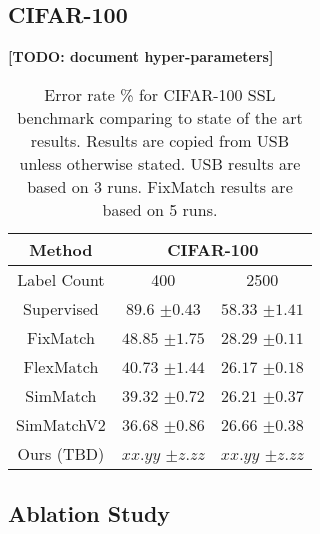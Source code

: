 \documentclass[10pt,twocolumn,letterpaper]{article}
\newcommand{\TODO}[1]{\textbf{\color{red}[TODO: #1]}}
\begin{document}

\subsection{CIFAR-100}

\TODO {document hyper-parameters}


\begin{table}[htbp]
	\begin{tabular}{c|cc}
		Method            & \multicolumn{2}{c}{CIFAR-100} \\ 
		\hline
		Label Count           & 400           & 2500          \\
		Supervised   & $89.6$ \scriptsize{$\pm0.43$}    & $58.33$ \scriptsize{$\pm1.41$}   \\ \hline
		FixMatch      & $48.85$ \scriptsize{$\pm1.75$}   & $28.29$ \scriptsize{$\pm0.11$}   \\
		FlexMatch   & $40.73$ \scriptsize{$\pm1.44$}   & $26.17$ \scriptsize{$\pm0.18$}   \\
		SimMatch    & $39.32$ \scriptsize{$\pm0.72$}   & $26.21$ \scriptsize{$\pm0.37$}   \\
		SimMatchV2    & $36.68$ \scriptsize{$\pm0.86$}   & $26.66$ \scriptsize{$\pm0.38$}   \\ \hline
		Ours (TBD)                            & $xx.yy$ \scriptsize{$\pm z.zz$}           & $xx.yy$ \scriptsize{$\pm z.zz$}  
	\end{tabular}
	\caption{Error rate \% for CIFAR-100 SSL benchmark comparing to state of the art results. Results are copied from USB \cite{wang2022usb} unless otherwise stated. USB results are based on 3 runs. FixMatch \cite{sohn2020fixmatch} results are based on 5 runs.}
	\label{table3}
\end{table}

\subsection{Ablation Study}
\end{document}
